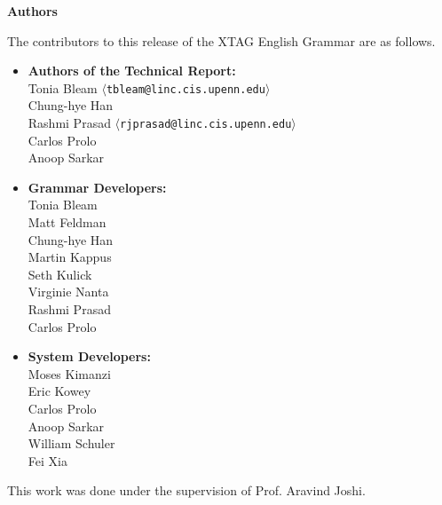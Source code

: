 \pagestyle{plain}
\null\vfil
\begin{center}
{\bf Authors}
\end{center}
\setcounter{page}{0}

The contributors to this release of the XTAG English Grammar are as
follows.

\begin{itemize}
\item
{\bf Authors of the Technical Report:} \\
Tonia Bleam {\tt $\langle$tbleam@linc.cis.upenn.edu$\rangle$} \\
Chung-hye Han \\ 
Rashmi Prasad {\tt $\langle$rjprasad@linc.cis.upenn.edu$\rangle$} \\ 
Carlos Prolo \\ 
Anoop Sarkar

\item
{\bf Grammar Developers:} \\
Tonia Bleam \\ 
Matt Feldman \\ 
Chung-hye Han \\
Martin Kappus \\ 
Seth Kulick \\
Virginie Nanta \\
Rashmi Prasad \\
Carlos Prolo

\item
{\bf System Developers:} \\
Moses Kimanzi \\
Eric Kowey \\
Carlos Prolo \\
Anoop Sarkar \\
William Schuler \\
Fei Xia

\end{itemize}

This work was done under the supervision of Prof. Aravind Joshi.

\newpage

